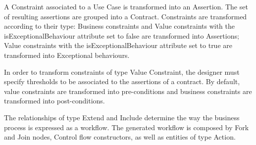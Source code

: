 
A {\sf Constraint} associated to a {\sf Use Case}  is transformed into an  {\sf Assertion}.  
The set of resulting assertions  are grouped into a {\sf Contract}.
Constraints are transformed according to their type:
{\sc Business} constraints and {\sc Value} constraints with the {\sf  isExceptionalBehaviour} attribute set to false are transformed into {\sf Assertion}s;
{\sc Value } constraints with the {\sf  isExceptionalBehaviour} attribute set to true are transformed into {\sf Exceptional behaviour}s.

In order to transform constraints of type {\sf Value Constraint}, the designer must specify thresholds to be associated to the assertions of a contract.
By default, value constraints are transformed into pre-conditions and business constraints are transformed into post-conditions. 
  
%
%


The relationships of type  {\sc Extend} and {\sc Include}  determine the way the business process is expressed as a workflow.  
The generated workflow is composed by {\sf Fork} and {\sf Join} nodes,  {\sc Control flow} constructors, as well as entities of type {\sc Action}.


